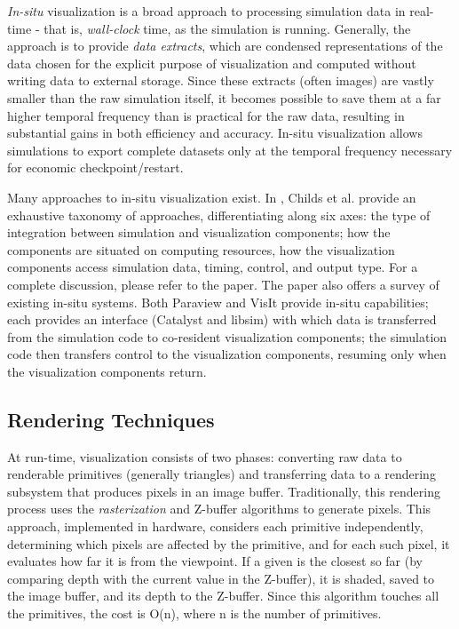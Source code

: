 \documentclass[journal]{IEEEtran}
\begin{document}
\textit{In-situ} visualization is a broad approach to processing simulation data in real-time - that is, \textit{wall-clock} time, as the simulation is running.  Generally, the approach is to provide \textit{data extracts}, which are condensed representations of the data chosen for the explicit purpose of visualization and computed without writing data to external storage.  Since these extracts (often images) are vastly smaller than the raw simulation itself, it becomes possible to save them at a far higher temporal frequency than is practical for the raw data, resulting in substantial gains in both efficiency and accuracy.  In-situ visualization allows simulations to export complete datasets only at the temporal frequency necessary for economic checkpoint/restart. 
 
Many approaches to in-situ visualization exist.  In \cite{Childs:IJHPCA}, Childs et al. provide an exhaustive taxonomy of approaches, differentiating along six axes: the type of integration between simulation and visualization components;  how the components are situated on computing resources, how the visualization components access simulation data, timing, control, and output type.  For a complete discussion, please refer to the paper.  The paper also offers a survey of existing in-situ systems.  Both Paraview and VisIt provide in-situ capabilities; each provides an interface (Catalyst and libsim) with which data is transferred from the simulation code to co-resident visualization components; the simulation code then transfers control to the visualization components, resuming only when the visualization components return.
 
\subsection{Rendering Techniques}
At run-time, visualization consists of two phases: converting raw data to renderable primitives (generally triangles) and transferring data to a rendering subsystem that produces pixels in an image buffer.  Traditionally, this rendering process uses the \textit{rasterization} and Z-buffer algorithms to generate pixels. This approach, implemented in hardware, considers each primitive independently, determining which pixels are affected by the primitive, and for each such pixel, it evaluates how far it is from the viewpoint. If a given is the closest so far (by comparing depth with the current value in the Z-buffer), it is shaded, saved to the image buffer, and its depth to the Z-buffer.  Since this algorithm touches all the primitives, the cost is O(n), where n is the number of primitives.
\end{document}
